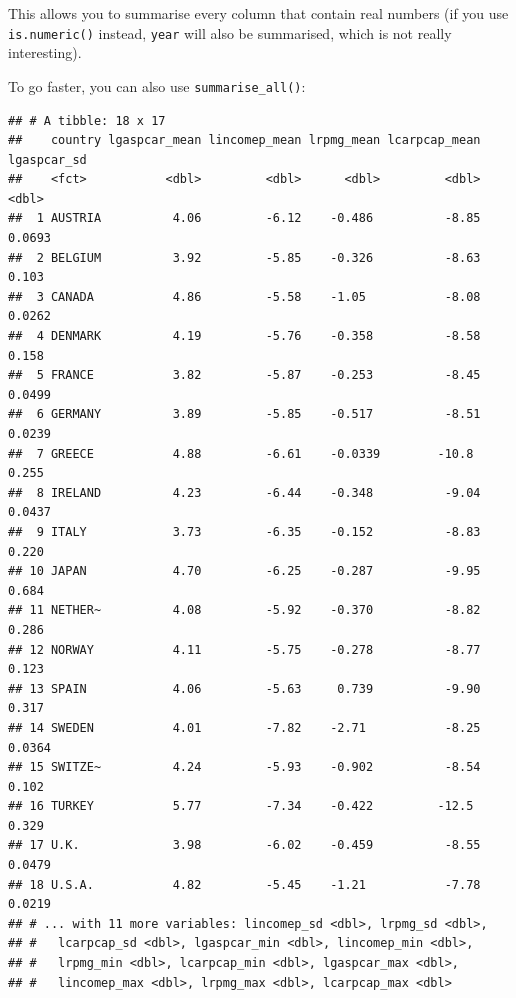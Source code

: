\documentclass[]{gitbook}
\newenvironment{Shaded}{\begin{snugshade}}{\end{snugshade}}
\newcommand{\KeywordTok}[1]{\textcolor[rgb]{0.13,0.29,0.53}{\textbf{#1}}}
\newcommand{\NormalTok}[1]{#1}
\newcommand{\OperatorTok}[1]{\textcolor[rgb]{0.81,0.36,0.00}{\textbf{#1}}}
\newcommand{\StringTok}[1]{\textcolor[rgb]{0.31,0.60,0.02}{#1}}
\theoremstyle{definition}
\theoremstyle{definition}
\theoremstyle{definition}
\theoremstyle{remark}
\begin{document}
This allows you to summarise every column that contain real numbers (if
you use \texttt{is.numeric()} instead, \texttt{year} will also be
summarised, which is not really interesting).

To go faster, you can also use \texttt{summarise\_all()}:

\begin{Shaded}
\end{Shaded}

\begin{verbatim}
## # A tibble: 18 x 17
##    country lgaspcar_mean lincomep_mean lrpmg_mean lcarpcap_mean lgaspcar_sd
##    <fct>           <dbl>         <dbl>      <dbl>         <dbl>       <dbl>
##  1 AUSTRIA          4.06         -6.12    -0.486          -8.85      0.0693
##  2 BELGIUM          3.92         -5.85    -0.326          -8.63      0.103 
##  3 CANADA           4.86         -5.58    -1.05           -8.08      0.0262
##  4 DENMARK          4.19         -5.76    -0.358          -8.58      0.158 
##  5 FRANCE           3.82         -5.87    -0.253          -8.45      0.0499
##  6 GERMANY          3.89         -5.85    -0.517          -8.51      0.0239
##  7 GREECE           4.88         -6.61    -0.0339        -10.8       0.255 
##  8 IRELAND          4.23         -6.44    -0.348          -9.04      0.0437
##  9 ITALY            3.73         -6.35    -0.152          -8.83      0.220 
## 10 JAPAN            4.70         -6.25    -0.287          -9.95      0.684 
## 11 NETHER~          4.08         -5.92    -0.370          -8.82      0.286 
## 12 NORWAY           4.11         -5.75    -0.278          -8.77      0.123 
## 13 SPAIN            4.06         -5.63     0.739          -9.90      0.317 
## 14 SWEDEN           4.01         -7.82    -2.71           -8.25      0.0364
## 15 SWITZE~          4.24         -5.93    -0.902          -8.54      0.102 
## 16 TURKEY           5.77         -7.34    -0.422         -12.5       0.329 
## 17 U.K.             3.98         -6.02    -0.459          -8.55      0.0479
## 18 U.S.A.           4.82         -5.45    -1.21           -7.78      0.0219
## # ... with 11 more variables: lincomep_sd <dbl>, lrpmg_sd <dbl>,
## #   lcarpcap_sd <dbl>, lgaspcar_min <dbl>, lincomep_min <dbl>,
## #   lrpmg_min <dbl>, lcarpcap_min <dbl>, lgaspcar_max <dbl>,
## #   lincomep_max <dbl>, lrpmg_max <dbl>, lcarpcap_max <dbl>
\end{verbatim}
\end{document}
